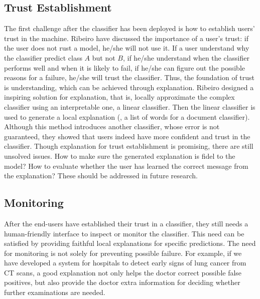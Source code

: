 \subsection{Trust Establishment}
The first challenge after the classifier has been deployed is how to establish users' trust in the machine.  Ribeiro \etal \cite{ribeiro2016kdd} have discussed the importance of a user's trust: if the user does not rust a model, he/she will not use it. If a user understand why the classifier predict class $A$ but not $B$, if he/she understand when the classifier performs well and when it is likely to fail, if he/she can figure out the possible reasons for a failure, he/she will trust the classifier. Thus, the foundation of trust is understanding, which can be achieved through explanation. Ribeiro \etal designed a inspiring solution for explanation, that is, locally approximate the complex classifier using an interpretable one, a linear classifier. Then the linear classifier is used to generate a local explanation (\eg, a list of words for a document classifier). Although this method introduces another classifier, whose error is not guaranteed, they showed that users indeed have more confident and trust in the classifier. Though explanation for trust establishment is promising, there are still unsolved issues. How to make sure the generated explanation is fidel to the model? How to evaluate whether the user has learned the correct message from the explanation? These should be addressed in future research.

\subsection{Monitoring}
After the end-users have established their trust in a classifier, they still needs a human-friendly interface to inspect or monitor the classifier. This need can be satisfied by providing faithful local explanations for specific predictions. The need for monitoring is not solely for preventing possible failure. For example, if we have developed a system for hospitals to detect early signs of lung cancer from CT scans, a good explanation not only helps the doctor correct possible false positives, but also provide the doctor extra information for deciding whether further examinations are needed. 










